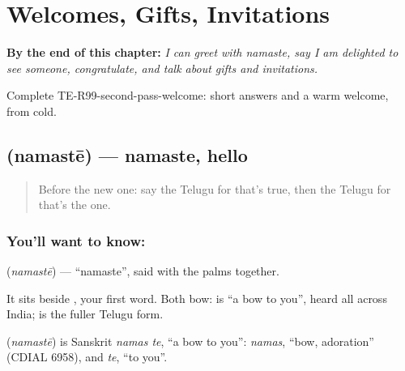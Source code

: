 
\chapter{Welcomes, Gifts, Invitations}
\label{ch:te-welcomes-gifts}

\begin{chapteropening}
\textbf{By the end of this chapter:} \emph{I can greet with namaste, say I am delighted to see someone, congratulate, and talk about gifts and invitations.}

Complete TE-R99-second-pass-welcome: short answers and a warm welcome, from cold.
\end{chapteropening}

\section[\texorpdfstring{\te{నమస్తే} (namastē)}{నమస్తే (namastē)}]{ (namastē) — namaste, hello}

\label{lesson:TE-C99-namaste}



\begin{quote}
Before the new one: say the Telugu for that's true, then the Telugu for that's the one.
\end{quote}

\subsection*{You'll want to know: }
\textbf{} (\emph{namastē}) — \textquotedblleft{}namaste\textquotedblright{}, said with the palms together.

It sits beside \textbf{}, your first word. Both bow: \textbf{} is \textquotedblleft{}a bow to you\textquotedblright{}, heard all across India; \textbf{} is the fuller Telugu form.

\begin{cousinweb}
\textbf{} (\emph{namastē}) is Sanskrit \emph{namas te}, \textquotedblleft{}a bow to you\textquotedblright{}: \emph{namas}, \textquotedblleft{}bow, adoration\textquotedblright{} (CDIAL 6958), and \emph{te}, \textquotedblleft{}to you\textquotedblright{}.
\end{cousinweb}

